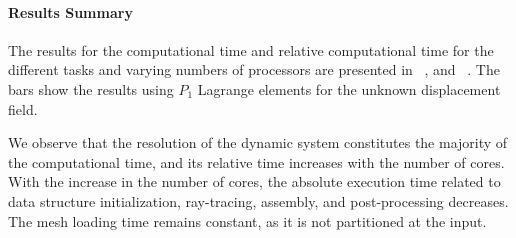 \paragraph{Results Summary}

The results for the computational time and relative computational time for the 
different tasks and varying numbers of processors are presented in ~, 
and ~. The bars show the results using $P_1$ Lagrange 
elements for the unknown displacement field. 


We observe that the resolution of the dynamic system constitutes the majority of 
the computational time, and its relative time increases with the number of cores. 
With the increase in the number of cores, the absolute execution time related to 
data structure initialization, ray-tracing, assembly, and post-processing decreases. 
The mesh loading time remains constant, as it is not partitioned at the input.


\dataContact

